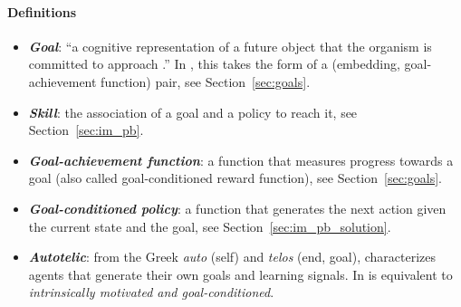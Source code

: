\begin{tcolorbox}
\small
\paragraph{Definitions}
\begin{itemize}
    \item \textit{\textbf{Goal}}: ``a cognitive representation of a future object that the organism is committed to approach \cite{elliot2008goal}.'' In \rl, this takes the form of a (embedding, goal-achievement function) pair, see Section~\ref{sec:goals}.
    \item \textit{\textbf{Skill}}: the association of a goal and a policy to reach it, see Section~\ref{sec:im_pb}.
    \item \textit{\textbf{Goal-achievement function}}: a function that measures progress towards a goal (also called goal-conditioned reward function), see Section~\ref{sec:goals}.
    \item \textit{\textbf{Goal-conditioned policy}}: a function that generates the next action given the current state and the goal, see Section~\ref{sec:im_pb_solution}.
    \item \textit{\textbf{Autotelic}}: from the Greek \textit{auto} (self) and \textit{telos} (end, goal), characterizes agents that generate their own goals and learning signals. In is equivalent to \textit{intrinsically motivated and goal-conditioned}.
\end{itemize}
\end{tcolorbox}